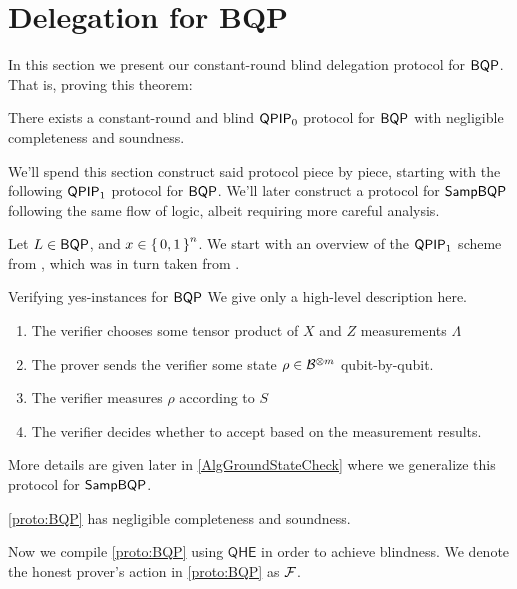 \section{Delegation for BQP}
\label{sec:BlindBQP}

In this section we present our constant-round blind delegation protocol for $\operatorname{\mathsf{BQP}}$. That is, proving this theorem:
\begin{thm}
	There exists a constant-round and blind $\operatorname{\mathsf{QPIP}}_0$ protocol for $\operatorname{\mathsf{BQP}}$ with negligible completeness and soundness.
\end{thm}
We'll spend this section construct said protocol piece by piece, starting with the following $\operatorname{\mathsf{QPIP}}_1$ protocol for $\operatorname{\mathsf{BQP}}$.
We'll later construct a protocol for $\operatorname{\mathsf{SampBQP}}$ following the same flow of logic, albeit requiring more careful analysis.

Let $L\in\operatorname{\mathsf{BQP}}$, and $x\in\set{0,1}^n$.
We start with an overview of the $\operatorname{\mathsf{QPIP}}_1$ scheme from \cite{mahadev_delegation}, which was in turn taken from \cite{mf16}.

\begin{protocol}{Verifying yes-instances for $\operatorname{\mathsf{BQP}}$}
	\label{proto:BQP}
	We give only a high-level description here.
	\begin{enumerate}
		\item The verifier chooses some tensor product of $X$ and $Z$ measurements $\Lambda$
		\item The prover sends the verifier some state $\rho\in\mathcal{B}^{\otimes m}$ qubit-by-qubit.
		\item The verifier measures $\rho$ according to $S$
		\item The verifier decides whether to accept based on the measurement results.
	\end{enumerate}
	More details are given later in \cref{AlgGroundStateCheck} where we generalize this protocol for $\operatorname{\mathsf{SampBQP}}$.
\end{protocol}

\cref{proto:BQP} has negligible completeness and soundness. 

Now we compile \cref{proto:BQP} using $\mathsf{QHE}$ in order to achieve blindness.
We denote the honest prover's action in \cref{proto:BQP} as $\mathcal{F}$.

